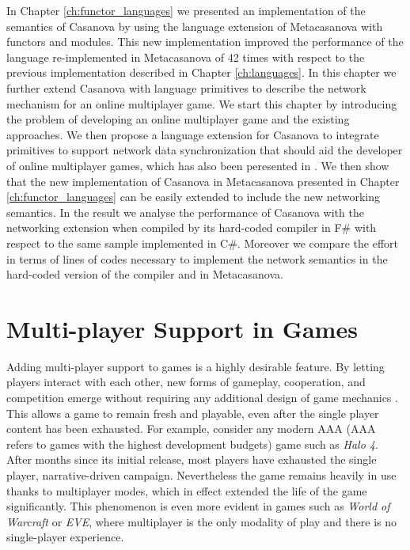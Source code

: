 In Chapter \ref{ch:functor_languages} we presented an implementation of the semantics of Casanova by using the language extension of Metacasanova with functors and modules. This new implementation improved the performance of the language re-implemented in Metacasanova of 42 times with respect to the previous implementation described in Chapter \ref{ch:languages}. In this chapter we further extend Casanova with language primitives to describe the network mechanism for an online multiplayer game. We start this chapter by introducing the problem of developing an online multiplayer game and the existing approaches. We then propose a language extension for Casanova to integrate primitives to support network data synchronization that should aid the developer of online multiplayer games, which has also been peresented in \cite{DIGIACOMO201725}. We then show that the new implementation of Casanova in Metacasanova presented in Chapter \ref{ch:functor_languages} can be easily extended to include the new networking semantics. In the result we analyse the performance of Casanova with the networking extension when compiled by its hard-coded compiler in F\# with respect to the same sample implemented in C\#. Moreover we compare the effort in terms of lines of codes necessary to implement the network semantics in the hard-coded version of the compiler and in Metacasanova.

\section{Multi-player Support in Games}
Adding multi-player support to games is a highly desirable feature. By letting players interact with each other, new forms of gameplay, cooperation, and competition emerge without requiring any additional design of game mechanics \cite{granberg2014david}. This allows a game to remain fresh and playable, even after the single player content has been exhausted. For example, consider any modern AAA (AAA refers to games with the highest development budgets\cite{wolf2008video}) game such as \textit{Halo 4}. After months since its initial release, most players have exhausted the single player, narrative-driven campaign. Nevertheless the game remains heavily in use thanks to multiplayer modes, which in effect extended the life of the game significantly. This phenomenon is even more evident in games such as \textit{World of Warcraft} or \textit{EVE}, where multiplayer is the only modality of play and there is no single-player experience.

